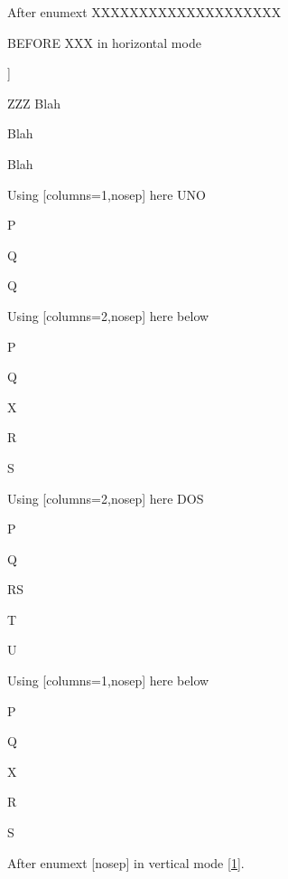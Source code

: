 \documentclass[10pt]{article}
\begin{document}
After enumext XXXXXXXXXXXXXXXXXXXX






BEFORE XXX in horizontal mode

\begin{enumext}[columns=2,nosep,label={(\arabic*.)},ref=[\roman*]]%

   \item\label{1} ZZZ Blah %
   \item\label{2} Blah %
   \item\label{3} Blah

\item Using [columns=1,nosep] here UNO \label{test}

  \begin{enumext}[columns=1,nosep,label=\arabic{enumXi}.(\alph*)]%
     \item  P \item Q \item Q
  \end{enumext}

\item Using [columns=2,nosep] here below
\begin{enumext}[columns=1,nosep]%
     \item  P \item Q \item X  \item R \item S
  \end{enumext}

\columnbreak

\item Using [columns=2,nosep] here DOS
  \begin{enumext}[columns=2,nosep]%
    \item  P \item Q \item RS \item T \item U
  \end{enumext}

\item Using [columns=1,nosep] here below
\begin{enumext}[columns=1,nosep]%
     \item  P \item Q \item X  \item R \item S
  \end{enumext}

\end{enumext}



After enumext [nosep] in vertical mode \ref{1}. %
\end{document}
